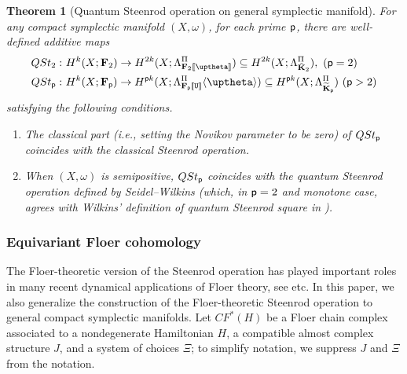 \documentclass[reqno, 10pt]{amsart}
\numberwithin{equation}{section}
\numberwithin{equation}{section}
\newtheorem{thma}{Theorem}
\renewcommand{\subset}{\subseteq}
\theoremstyle{definition}
\theoremstyle{remark}
\newcommand{\beqn}{\begin{equation*}}
\newcommand{\eeqn}{\end{equation*}}
\newcommand{\p}{{\sf p}}
\newcommand{\fp}{{\bf F}_{\sf p}}
\newcommand{\tkp}{\wt{\bf K}_{\sf p}}
\newcommand{\tu}{\mathtt{U}}
\newcommand{\psu}{{[\![\tu]\!]}}
\newcommand{\pst}{{[\![\uptheta]\!]}}
\newcommand{\wt}{\widetilde}
\begin{document}
\begin{thma}[Quantum Steenrod operation on general symplectic manifold]\label{thma_QST} For any compact symplectic manifold $(X, \omega)$, for each prime $\p$, there are well-defined additive maps
\beqn
\begin{split}
QSt_2: &\ H^k (X; {\bf F}_2) \to H^{2k}( X; \Lambda_{{\bf F}_2 \pst}^\Pi) \subset H^{2k} (X; \Lambda_{\tilde {\bf K}_2}^\Pi),\ (\p = 2)\\
QSt_\p: &\ H^k(X; \fp) \to H^{\p k}(X; \Lambda_{\fp \psu}^\Pi \langle \uptheta \rangle ) \subset H^{\p k}(X; \Lambda_{\tkp}^\Pi)\ (\p > 2)
\end{split}
\eeqn
satisfying the following conditions.
\begin{enumerate}

\item The classical part (i.e., setting the Novikov parameter to be zero) of $QSt_\p$ coincides with the classical Steenrod operation.

\item When $(X, \omega)$ is semipositive, $QSt_\p$ coincides with the quantum Steenrod operation defined by Seidel--Wilkins \cite{Seidel_Wilkins_2022} (which, in $\p=2$ and monotone case, agrees with Wilkins' definition of quantum Steenrod square in \cite{Wilkins_2020}).
\end{enumerate}
\end{thma}
 

\subsubsection{Equivariant Floer cohomology}

The Floer-theoretic version of the Steenrod operation has played important roles in many recent dynamical applications of Floer theory, see \cite{Seidel_pants} \cite{shelukhin20, shelukhin-21, shelukhin-22} \cite{CGG} etc. In this paper, we also generalize the construction of the Floer-theoretic Steenrod operation to general compact symplectic manifolds. Let $CF^*(H)$ be a Floer chain complex associated to a nondegenerate Hamiltonian $H$, a compatible almost complex structure $J$, and a system of choices $\Xi$; to simplify notation, we suppress $J$ and $\Xi$ from the notation. 
\end{document}
